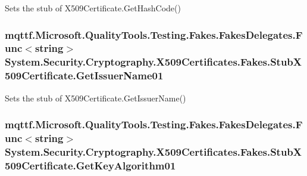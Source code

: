 Sets the stub of X509\-Certificate.\-Get\-Hash\-Code()

\hypertarget{class_system_1_1_security_1_1_cryptography_1_1_x509_certificates_1_1_fakes_1_1_stub_x509_certificate_a599e0e319b2a130759633cc3db47e625}{
\subsubsection[{Get\-Issuer\-Name01}]{\setlength{\rightskip}{0pt plus 5cm}mqttf.\-Microsoft.\-Quality\-Tools.\-Testing.\-Fakes.\-Fakes\-Delegates.\-Func$<$string$>$ System.\-Security.\-Cryptography.\-X509\-Certificates.\-Fakes.\-Stub\-X509\-Certificate.\-Get\-Issuer\-Name01}}\label{class_system_1_1_security_1_1_cryptography_1_1_x509_certificates_1_1_fakes_1_1_stub_x509_certificate_a599e0e319b2a130759633cc3db47e625}


Sets the stub of X509\-Certificate.\-Get\-Issuer\-Name()

\hypertarget{class_system_1_1_security_1_1_cryptography_1_1_x509_certificates_1_1_fakes_1_1_stub_x509_certificate_a863bf667a157291fc993facde6bad83e}{
\subsubsection[{Get\-Key\-Algorithm01}]{\setlength{\rightskip}{0pt plus 5cm}mqttf.\-Microsoft.\-Quality\-Tools.\-Testing.\-Fakes.\-Fakes\-Delegates.\-Func$<$string$>$ System.\-Security.\-Cryptography.\-X509\-Certificates.\-Fakes.\-Stub\-X509\-Certificate.\-Get\-Key\-Algorithm01}}\label{class_system_1_1_security_1_1_cryptography_1_1_x509_certificates_1_1_fakes_1_1_stub_x509_certificate_a863bf667a157291fc993facde6bad83e}


